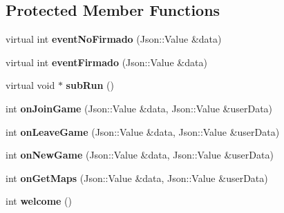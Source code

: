 \subsection*{Protected Member Functions}
\begin{DoxyCompactItemize}
\item 
\hypertarget{classThreadUsuario_a8e1776d0b712b02710564f5172476fab}{virtual int {\bfseries event\-No\-Firmado} (Json\-::\-Value \&data)}\label{classThreadUsuario_a8e1776d0b712b02710564f5172476fab}

\item 
\hypertarget{classThreadUsuario_a0ed65fc90c1e188cd3a492dbebf9d0a2}{virtual int {\bfseries event\-Firmado} (Json\-::\-Value \&data)}\label{classThreadUsuario_a0ed65fc90c1e188cd3a492dbebf9d0a2}

\item 
\hypertarget{classThreadUsuario_a7f7c0738bd4320e3f9f2eb065a2d45f3}{virtual void $\ast$ {\bfseries sub\-Run} ()}\label{classThreadUsuario_a7f7c0738bd4320e3f9f2eb065a2d45f3}

\item 
\hypertarget{classThreadUsuario_ab51cc252bc76f33fefb4b601f47b289c}{int {\bfseries on\-Join\-Game} (Json\-::\-Value \&data, Json\-::\-Value \&user\-Data)}\label{classThreadUsuario_ab51cc252bc76f33fefb4b601f47b289c}

\item 
\hypertarget{classThreadUsuario_a541854eb8f6a5c47cec0ebc30e403bc8}{int {\bfseries on\-Leave\-Game} (Json\-::\-Value \&data, Json\-::\-Value \&user\-Data)}\label{classThreadUsuario_a541854eb8f6a5c47cec0ebc30e403bc8}

\item 
\hypertarget{classThreadUsuario_ab6033809c7c416bb2210c7fabec26ae7}{int {\bfseries on\-New\-Game} (Json\-::\-Value \&data, Json\-::\-Value \&user\-Data)}\label{classThreadUsuario_ab6033809c7c416bb2210c7fabec26ae7}

\item 
\hypertarget{classThreadUsuario_a56b98549728c0f4aa77282325414ca32}{int {\bfseries on\-Get\-Maps} (Json\-::\-Value \&data, Json\-::\-Value \&user\-Data)}\label{classThreadUsuario_a56b98549728c0f4aa77282325414ca32}

\item 
\hypertarget{classThreadUsuario_a88100073941ca7caf1a38dd019e10946}{int {\bfseries welcome} ()}\label{classThreadUsuario_a88100073941ca7caf1a38dd019e10946}

\end{DoxyCompactItemize}
